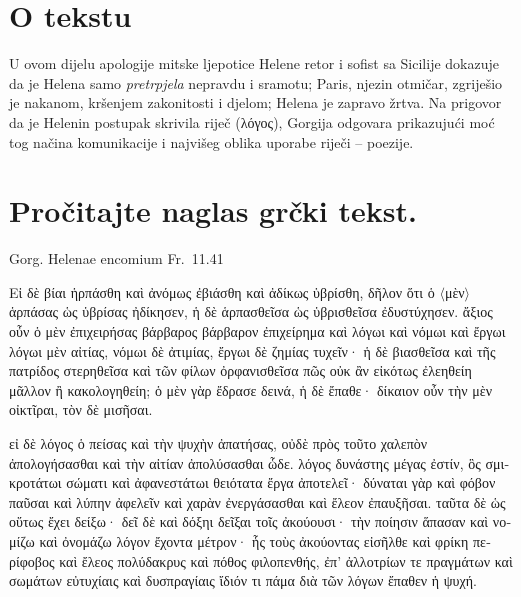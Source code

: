 


\section*{O tekstu}

U ovom dijelu apologije mitske ljepotice Helene retor i sofist sa Sicilije dokazuje da je Helena samo \textit{pretrpjela} nepravdu i sramotu; Paris, njezin otmičar, zgriješio je nakanom, kršenjem zakonitosti i djelom; Helena je zapravo žrtva. Na prigovor da je Helenin postupak skrivila riječ (λόγος), Gorgija odgovara prikazujući moć tog načina komunikacije i najvišeg oblika uporabe riječi – poezije.


\section*{Pročitajte naglas grčki tekst.}
Gorg. Helenae encomium Fr.\ 11.41

\medskip

{\large
\begin{greek}
\noindent Εἰ δὲ βίαι ἡρπάσθη καὶ ἀνόμως ἐβιάσθη καὶ ἀδίκως ὑβρίσθη, δῆλον ὅτι ὁ $\langle$μὲν$\rangle$ ἁρπάσας ὡς ὑβρίσας ἠδίκησεν, ἡ δὲ ἁρπασθεῖσα ὡς ὑβρισθεῖσα ἐδυστύχησεν. ἄξιος οὖν ὁ μὲν ἐπιχειρήσας βάρβαρος βάρβαρον ἐπιχείρημα καὶ λόγωι καὶ νόμωι καὶ ἔργωι λόγωι μὲν αἰτίας, νόμωι δὲ ἀτιμίας, ἔργωι δὲ ζημίας τυχεῖν· ἡ δὲ βιασθεῖσα καὶ τῆς πατρίδος στερηθεῖσα καὶ τῶν φίλων ὀρφανισθεῖσα πῶς οὐκ ἂν εἰκότως ἐλεηθείη μᾶλλον ἢ κακολογηθείη; ὁ μὲν γὰρ ἔδρασε δεινά, ἡ δὲ ἔπαθε· δίκαιον οὖν τὴν μὲν οἰκτῖραι, τὸν δὲ μισῆσαι. 

εἰ δὲ λόγος ὁ πείσας καὶ τὴν ψυχὴν ἀπατήσας, οὐδὲ πρὸς τοῦτο χαλεπὸν ἀπολογήσασθαι καὶ τὴν αἰτίαν ἀπολύσασθαι ὧδε. λόγος δυνάστης μέγας ἐστίν, ὃς σμικροτάτωι σώματι καὶ ἀφανεστάτωι θειότατα ἔργα ἀποτελεῖ· δύναται γὰρ καὶ φόβον παῦσαι καὶ λύπην ἀφελεῖν καὶ χαρὰν ἐνεργάσασθαι καὶ ἔλεον ἐπαυξῆσαι. ταῦτα δὲ ὡς οὕτως ἔχει δείξω· δεῖ δὲ καὶ δόξηι δεῖξαι τοῖς ἀκούουσι· τὴν ποίησιν ἅπασαν καὶ νομίζω καὶ ὀνομάζω λόγον ἔχοντα μέτρον· ἧς τοὺς ἀκούοντας εἰσῆλθε καὶ φρίκη περίφοβος καὶ ἔλεος πολύδακρυς καὶ πόθος φιλοπενθής, ἐπ' ἀλλοτρίων τε πραγμάτων καὶ σωμάτων εὐτυχίαις καὶ δυσπραγίαις ἴδιόν τι πάμα διὰ τῶν λόγων ἔπαθεν ἡ ψυχή.

\end{greek}

}


